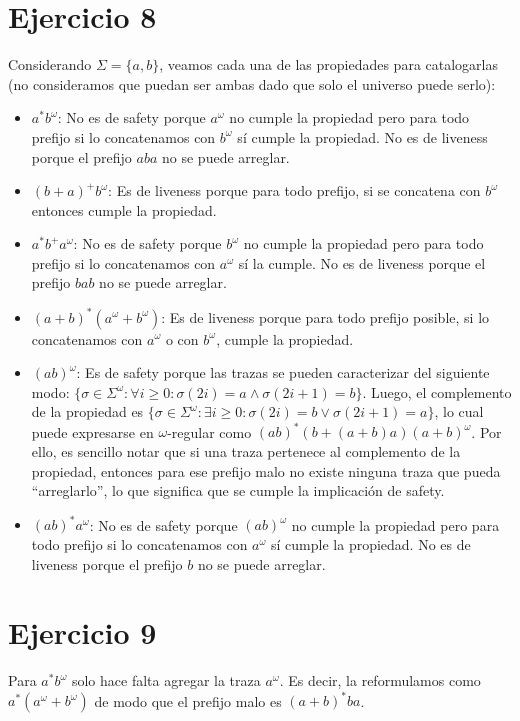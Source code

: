 \documentclass{article}
\begin{document}
\section*{Ejercicio 8}
Considerando $\Sigma = \{a, b\}$, veamos cada una de las propiedades para catalogarlas (no consideramos que puedan ser ambas dado que solo el universo puede serlo):
\begin{itemize}
	\item $a^*b^\omega$: No es de safety porque $a^\omega$ no cumple la propiedad pero para todo prefijo si lo concatenamos con $b^\omega$ sí cumple la propiedad.
	      No es de liveness porque el prefijo $aba$ no se puede arreglar.
	\item $(b + a)^+b^\omega$: Es de liveness porque para todo prefijo, si se concatena con $b^\omega$ entonces cumple la propiedad.
	\item $a^*b^+a^\omega$: No es de safety porque $b^\omega$ no cumple la propiedad pero para todo prefijo si lo concatenamos con $a^\omega$ sí la cumple.
	      No es de liveness porque el prefijo $bab$ no se puede arreglar.
	\item $(a + b)^*(a^\omega + b^\omega)$: Es de liveness porque para todo prefijo posible, si lo concatenamos con $a^\omega$ o con $b^\omega$, cumple la propiedad.
	\item $(ab)^\omega$: Es de safety porque las trazas se pueden caracterizar del siguiente modo: $\{\sigma \in \Sigma^\omega : \forall i \geq 0 : \sigma(2i) = a \land \sigma(2i + 1) = b\}$.
	      Luego, el complemento de la propiedad es $\{\sigma \in \Sigma^\omega : \exists i \geq 0 : \sigma(2i) = b \lor \sigma(2i + 1) = a\}$, lo cual puede expresarse en $\omega$-regular como $(ab)^*(b + (a + b)a)(a + b)^\omega$.
	      Por ello, es sencillo notar que si una traza pertenece al complemento de la propiedad, entonces para ese prefijo malo no existe ninguna traza que pueda ``arreglarlo'', lo que significa que se cumple la implicación de safety.
	\item $(ab)^*a^\omega$: No es de safety porque $(ab)^\omega$ no cumple la propiedad pero para todo prefijo si lo concatenamos con $a^\omega$ sí cumple la propiedad.
	      No es de liveness porque el prefijo $b$ no se puede arreglar.
\end{itemize}

\section*{Ejercicio 9}
Para $a^*b^\omega$ solo hace falta agregar la traza $a^\omega$.
Es decir, la reformulamos como $a^*(a^\omega + b^\omega)$ de modo que el prefijo malo es $(a + b)^*ba$.
\end{document}
